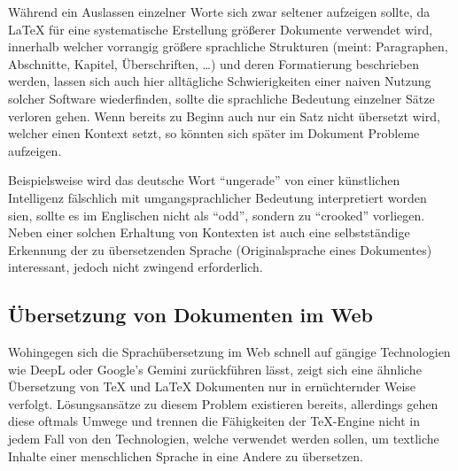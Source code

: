 Während ein Auslassen einzelner Worte sich zwar seltener aufzeigen sollte, da \LaTeX{} für eine systematische Erstellung größerer Dokumente verwendet wird, innerhalb welcher vorrangig größere sprachliche Strukturen (meint: Paragraphen, Abschnitte, Kapitel, Überschriften, \ldots) und deren Formatierung beschrieben werden, lassen sich auch hier alltägliche Schwierigkeiten einer naiven Nutzung solcher Software wiederfinden, sollte die sprachliche Bedeutung einzelner Sätze verloren gehen. Wenn bereits zu Beginn auch nur ein Satz nicht übersetzt wird, welcher einen Kontext setzt, so könnten sich später im Dokument Probleme aufzeigen.

Beispielsweise wird das deutsche Wort \enquote{ungerade} von einer künstlichen Intelligenz fälschlich mit umgangsprachlicher Bedeutung interpretiert worden sien, sollte es im Englischen nicht als \enquote{odd}, sondern zu \enquote{crooked} vorliegen. Neben einer solchen Erhaltung von Kontexten ist auch eine selbstständige Erkennung der zu übersetzenden Sprache (Originalsprache eines Dokumentes) interessant, jedoch nicht zwingend erforderlich.\\
\noindent

\subsection{Übersetzung von Dokumenten im Web}
Wohingegen sich die Sprachübersetzung im Web schnell auf gängige Technologien wie DeepL oder Google's Gemini zurückführen lässt, zeigt sich eine ähnliche Übersetzung von \TeX{} und \LaTeX{} Dokumenten nur in ernüchternder Weise verfolgt. Lösungsansätze zu diesem Problem existieren bereits, allerdings gehen diese oftmals Umwege und trennen die Fähigkeiten der \TeX{}-Engine nicht in jedem Fall von den Technologien, welche verwendet werden sollen, um textliche Inhalte einer menschlichen Sprache in eine Andere zu übersetzen.\\
\noindent


